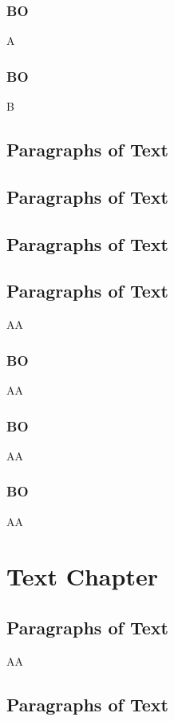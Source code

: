 \documentclass[11pt,fleqn]{book}
\begin{document}
\subsection{BO}
A
\newpage

\subsection{BO}
B

\section{Paragraphs of Text}
\section{Paragraphs of Text}
\section{Paragraphs of Text}
\section{Paragraphs of Text}
AA
\subsection{BO}
AA
\subsection{BO}
AA
\subsection{BO}
AA


\chapter{Text Chapter}

\section{Paragraphs of Text}
AA

\section{Paragraphs of Text}
\end{document}
